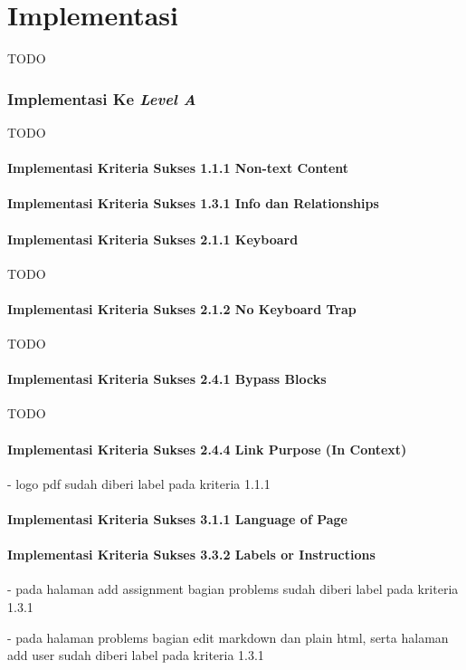 \chapter{Implementasi}
\label{chap:implementasi}
TODO

\subsection{Implementasi Ke \textit{Level A}}
\label{subsec:implementasi_A}
TODO

\subsubsection{Implementasi Kriteria Sukses 1.1.1 Non-text Content}
\label{subsubsec:implementasi_A_1.1.1}

\subsubsection{Implementasi Kriteria Sukses 1.3.1 Info dan Relationships}
\label{subsubsec:implementasi_A_1.3.1}

\subsubsection{Implementasi Kriteria Sukses 2.1.1 Keyboard}
\label{subsubsec:implementasi_A_2.1.1}
TODO

\subsubsection{Implementasi Kriteria Sukses 2.1.2 No Keyboard Trap}
\label{subsubsec:implementasi_A_2.1.2}
TODO

\subsubsection{Implementasi Kriteria Sukses 2.4.1 Bypass Blocks}
\label{subsubsec:implementasi_A_2.4.1}
TODO

\subsubsection{Implementasi Kriteria Sukses 2.4.4 Link Purpose (In Context)}
\label{subsubsec:implementasi_A_2.4.4}

- logo pdf sudah diberi label pada kriteria 1.1.1

\subsubsection{Implementasi Kriteria Sukses 3.1.1 Language of Page}
\label{subsubsec:implementasi_A_3.1.1}

\subsubsection{Implementasi Kriteria Sukses 3.3.2 Labels or Instructions}
\label{subsubsec:implementasi_A_3.3.2}

- pada halaman add assignment bagian problems sudah diberi label pada kriteria 1.3.1

- pada halaman problems bagian edit markdown dan plain html, serta halaman add user sudah diberi label pada kriteria 1.3.1